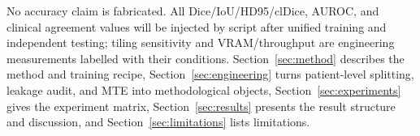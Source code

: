 No accuracy claim is fabricated. All Dice/IoU/HD95/clDice, AUROC, and clinical agreement values will be injected by script after unified training and independent testing; tiling sensitivity and VRAM/throughput are engineering measurements labelled with their conditions. Section~\ref{sec:method} describes the method and training recipe, Section~\ref{sec:engineering} turns patient-level splitting, leakage audit, and MTE into methodological objects, Section~\ref{sec:experiments} gives the experiment matrix, Section~\ref{sec:results} presents the result structure and discussion, and Section~\ref{sec:limitations} lists limitations.
